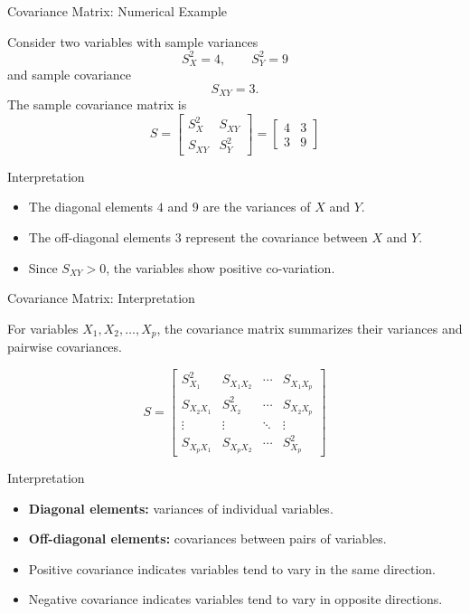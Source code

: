 \documentclass{beamer}
\begin{document}

\begin{frame}{Covariance Matrix: Numerical Example}

Consider two variables with sample variances
\[
S_X^2=4,
\qquad
S_Y^2=9
\]
and sample covariance
\[
S_{XY}=3.
\]
The sample covariance matrix is
\[
\boxed{
S=
\begin{bmatrix}
S_X^2 & S_{XY}\\
S_{XY} & S_Y^2
\end{bmatrix}
=
\begin{bmatrix}
4 & 3\\
3 & 9
\end{bmatrix}
}
\]

\begin{block}{Interpretation}
\begin{itemize}
    \item The diagonal elements $4$ and $9$ are the variances of $X$ and $Y$.
    \item The off-diagonal elements $3$ represent the covariance between $X$ and $Y$.
    \item Since $S_{XY}>0$, the variables show positive co-variation.
\end{itemize}
\end{block}

\end{frame}


\begin{frame}{Covariance Matrix: Interpretation}

For variables $X_1,X_2,\ldots,X_p$, the covariance matrix
summarizes their variances and pairwise covariances.

\[
S=
\begin{bmatrix}
S_{X_1}^2 & S_{X_1X_2} & \cdots & S_{X_1X_p}\\
S_{X_2X_1} & S_{X_2}^2 & \cdots & S_{X_2X_p}\\
\vdots & \vdots & \ddots & \vdots\\
S_{X_pX_1} & S_{X_pX_2} & \cdots & S_{X_p}^2
\end{bmatrix}
\]

\begin{block}{Interpretation}
\begin{itemize}
    \item \textbf{Diagonal elements:} variances of individual variables.
    \item \textbf{Off-diagonal elements:} covariances between pairs of variables.
    \item Positive covariance indicates variables tend to vary in the same direction.
    \item Negative covariance indicates variables tend to vary in opposite directions.
\end{itemize}
\end{block}

\end{frame}
\end{document}
